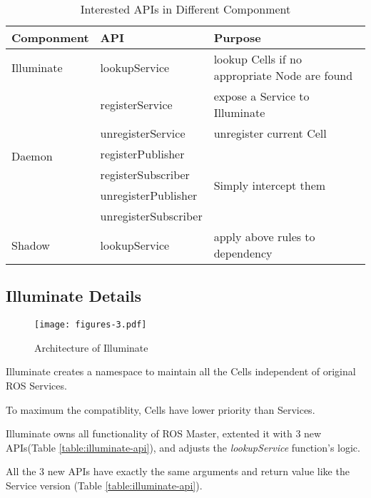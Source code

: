 \begin{table}
    \renewcommand{\arraystretch}{1.3}
    \caption{Interested APIs in Different Componment}
    \label{table:interested-apis}
    \centering
    \begin{tabular}{|l|l|l|}
        \hline
        \bfseries Componment & \bfseries  API & \bfseries Purpose \\
        \hline
        \multirow{1}{*}{Illuminate} & lookupService & lookup Cells if no appropriate Node are found \\
        \hline
        \multirow{6}{*}{Daemon} & registerService & expose a Service to Illuminate\\
        \cline{2-3} & unregisterService & unregister current Cell \\
        \cline{2-3} & registerPublisher & \multirow{4}{*}{Simply intercept them} \\
        \cline{2-2} & registerSubscriber    &  \\
        \cline{2-2} & unregisterPublisher   &  \\
        \cline{2-2} & unregisterSubscriber  &  \\
        \hline
        \multirow{1}{*}{Shadow} & lookupService & apply above rules to dependency \\
        \hline
    \end{tabular}
\end{table} 

\subsection{Illuminate Details}

\begin{figure}[!t]
\centering
\texttt{[image: figures-3.pdf]}
\caption{Architecture of Illuminate}
\label{figure:aoil}
\end{figure}

Illuminate creates a namespace to maintain all the Cells independent of
original ROS Services.

To maximum the compatiblity, Cells have lower priority than Services.

Illuminate owns all functionality of ROS Master,
extented it with 3 new APIs(Table \ref{table:illuminate-api}),
and adjusts the \emph{lookupService} function's logic.

All the 3 new APIs have exactly the same arguments and
return value like the Service version (Table \ref{table:illuminate-api}).

